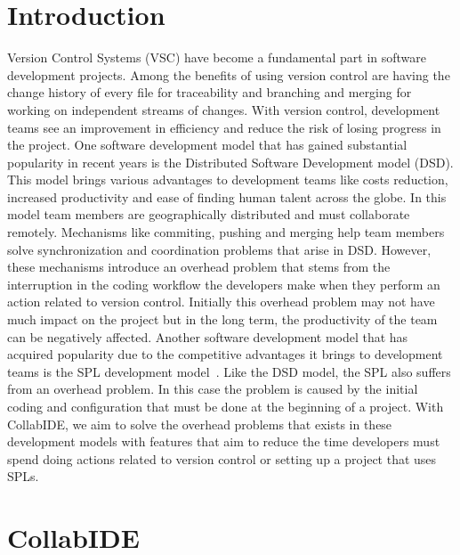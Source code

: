 \documentclass[draft]{llncs}
\begin{document}
\section{Introduction}
\label{sec:motivation}

Version Control Systems (VSC) have become a fundamental part in software development projects. 
Among the benefits of using version control are having the change history of every file for traceability 
and branching and merging for working on independent streams of changes. With version control, 
development teams see an improvement in efficiency and reduce the risk of losing progress in the 
project.
One software development model that has gained substantial popularity in recent years is the 
Distributed Software Development model (DSD). This model brings various advantages to 
development teams like costs reduction, increased productivity and ease of finding human talent 
across the globe. In this model team members are geographically distributed and must collaborate 
remotely. Mechanisms like commiting, pushing and merging help team members solve synchronization 
and coordination problems that arise in DSD. However, these mechanisms introduce an overhead 
problem that stems from the interruption in the coding workflow the developers make when they 
perform an action related to version control. Initially this overhead problem may not have much impact 
on the project but in the long term, the productivity of the team can be negatively affected.
Another software development model that has acquired popularity due to the competitive advantages 
it brings to development teams is the \ac{SPL} development model~\cite{pohl+05sple}. Like the DSD 
model, the SPL also suffers from an overhead problem. In this case the problem is caused by the initial 
coding and configuration that must be done at the beginning of a project.
With CollabIDE, we aim to solve the overhead problems that exists in these development models with 
features that aim to reduce the time developers must spend doing actions related to version control or 
setting up a project that uses \acp{SPL}.

\section{CollabIDE}
\label{sec:collab-ide}
\end{document}
